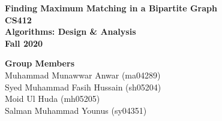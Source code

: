 \begin{titlepage}

\begin{center}

\vspace{-30mm}


\vspace*{34mm}
  \hspace*{14mm}
	\begin{center}
		{\fontsize{16}{20}\bf \color{headingblue} Finding Maximum Matching in a Bipartite Graph} \\[10ex]
    	{\fontsize{14}{16}\bf CS412} \\
    	{\fontsize{14}{16}\bf Algorithms: Design \& Analysis} \\
		{\fontsize{14}{16}\bf Fall 2020} \\
    \end{center}



\vspace{30mm}
\textbf{\Large Group Members}\\
\large Muhammad Munawwar Anwar (ma04289)\\
\large Syed Muhammad Fasih Hussain (sh05204)\\
\large Moid Ul Huda (mh05205)\\
\large Salman Muhammad Younus (sy04351)\\

\end{center}


\end{titlepage}
